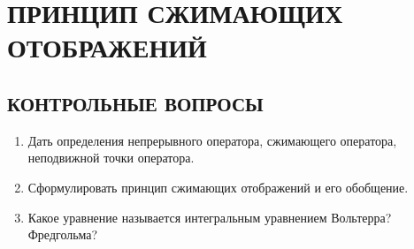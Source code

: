 \documentclass[12pt,a4paper]{article}
\begin{document}
\section{ПРИНЦИП СЖИМАЮЩИХ ОТОБРАЖЕНИЙ}

\subsection*{КОНТРОЛЬНЫЕ ВОПРОСЫ}
\begin{enumerate}
\item Дать определения непрерывного оператора, сжимающего оператора, неподвижной точки оператора.
\item Сформулировать принцип сжимающих отображений и его обобщение.
\item Какое уравнение называется интегральным уравнением Вольтерра? Фредгольма?
\end{enumerate}
\end{document}
